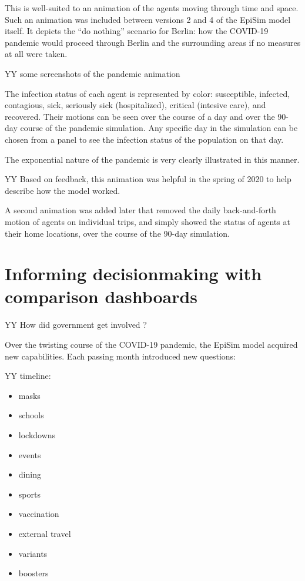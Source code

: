 This is well-suited to an animation of the agents moving through time
and space. Such an animation was included between versions 2 and 4 of
the EpiSim model itself. It depicts the ``do nothing'' scenario for
Berlin: how the COVID-19 pandemic would proceed through Berlin and the
surrounding areas if no measures at all were taken.

YY some screenshots of the pandemic animation

The infection status of each agent is represented by color: susceptible,
infected, contagious, sick, seriously sick (hospitalized), critical
(intesive care), and recovered. Their motions can be seen over the
course of a day and over the 90-day course of the pandemic simulation.
Any specific day in the simulation can be chosen from a panel to see the
infection status of the population on that day.

The exponential nature of the pandemic is very clearly illustrated in
this manner.

YY Based on feedback, this animation was helpful in the spring of 2020
to help describe how the model worked.

A second animation was added later that removed the daily back-and-forth
motion of agents on individual trips, and simply showed the status of
agents at their home locations, over the course of the 90-day
simulation.

\hypertarget{informing-decisionmaking-with-comparison-dashboards}{%
\section{Informing decisionmaking with comparison
dashboards}\label{informing-decisionmaking-with-comparison-dashboards}}

YY How did government get involved ?

Over the twisting course of the COVID-19 pandemic, the EpiSim model
acquired new capabilities. Each passing month introduced new questions:

YY timeline:

\begin{itemize}
\item
  masks
\item
  schools
\item
  lockdowns
\item
  events
\item
  dining
\item
  sports
\item
  vaccination
\item
  external travel
\item
  variants
\item
  boosters
\end{itemize}

